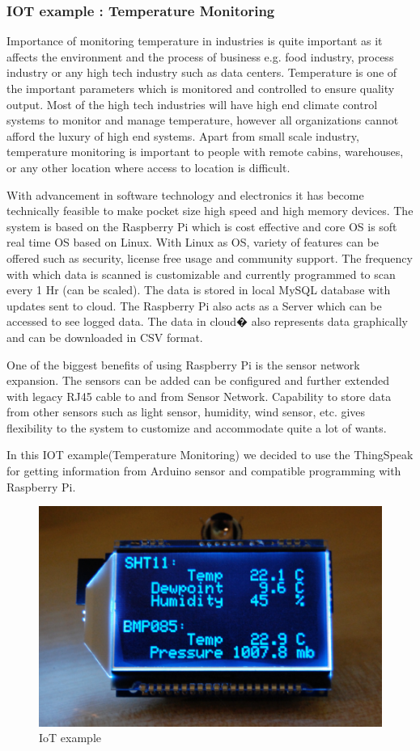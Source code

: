 \documentclass[conference]{IEEEtran}
\begin{document}
\subsubsection{IOT example : Temperature Monitoring}
 Importance of monitoring temperature in industries is quite important as it affects the environment and the process of business e.g. food industry, process industry or any high tech industry such as data centers. Temperature is one of the important parameters which is monitored and controlled to ensure quality output. Most of the high tech industries will have high end climate control systems to monitor and manage temperature, however all organizations cannot afford the luxury of high end systems. Apart from small scale industry, temperature monitoring is important to people with remote cabins, warehouses, or any other location where access to location is difficult.

With advancement in software technology and electronics it has become technically feasible to make pocket size high speed and high memory devices. The system is based on the Raspberry Pi which is cost effective and core OS is soft real time OS based on Linux. With Linux as OS, variety of features can be offered such as security, license free usage and community support. The frequency with which data is scanned is customizable and currently programmed to scan every 1 Hr (can be scaled). The data is stored in local MySQL database with updates sent to cloud. The Raspberry Pi also acts as a Server which can be accessed to see logged data. The data in cloud� also represents data graphically and can be downloaded in CSV format.

One of the biggest benefits of using Raspberry Pi is the sensor network expansion. The sensors can be added can be configured and further extended with legacy RJ45 cable to and from Sensor Network. Capability to store data from other sensors such as light sensor, humidity, wind sensor, etc. gives flexibility to the system to customize and accommodate quite a lot of wants.

In this IOT example(Temperature Monitoring) we decided to use the ThingSpeak for getting information from Arduino sensor and compatible programming with Raspberry Pi. 
\begin{figure}[H]
\begin{center}
    \includegraphics[scale=0.5]{iot}
    \caption{IoT example} \label{fig:label}
\end{center}
\end{figure}
\end{document}
